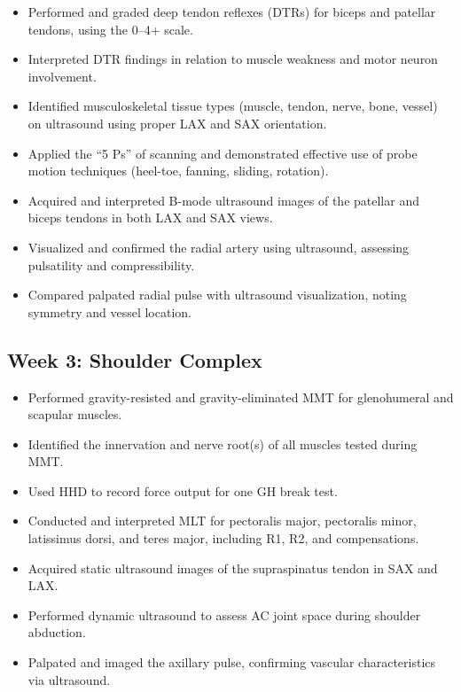 \begin{itemize}
  \item [$\square$] Performed and graded deep tendon reflexes (DTRs) for biceps and patellar tendons, using the 0–4+ scale.
  \item [$\square$] Interpreted DTR findings in relation to muscle weakness and motor neuron involvement.
  \item [$\square$] Identified musculoskeletal tissue types (muscle, tendon, nerve, bone, vessel) on ultrasound using proper LAX and SAX orientation.
  \item [$\square$] Applied the “5 Ps” of scanning and demonstrated effective use of probe motion techniques (heel-toe, fanning, sliding, rotation).
  \item [$\square$] Acquired and interpreted B-mode ultrasound images of the patellar and biceps tendons in both LAX and SAX views.
  \item [$\square$] Visualized and confirmed the radial artery using ultrasound, assessing pulsatility and compressibility.
  \item [$\square$] Compared palpated radial pulse with ultrasound visualization, noting symmetry and vessel location.
\end{itemize}


\subsection*{Week 3: Shoulder Complex}
\begin{itemize}
  \item [$\square$] Performed gravity-resisted and gravity-eliminated MMT for glenohumeral and scapular muscles.
  \item [$\square$] Identified the innervation and nerve root(s) of all muscles tested during MMT.
  \item [$\square$] Used HHD to record force output for one GH break test.
  \item [$\square$] Conducted and interpreted MLT for pectoralis major, pectoralis minor, latissimus dorsi, and teres major, including R1, R2, and compensations.
  \item [$\square$] Acquired static ultrasound images of the supraspinatus tendon in SAX and LAX.
  \item [$\square$] Performed dynamic ultrasound to assess AC joint space during shoulder abduction.
  \item [$\square$] Palpated and imaged the axillary pulse, confirming vascular characteristics via ultrasound.
\end{itemize}

